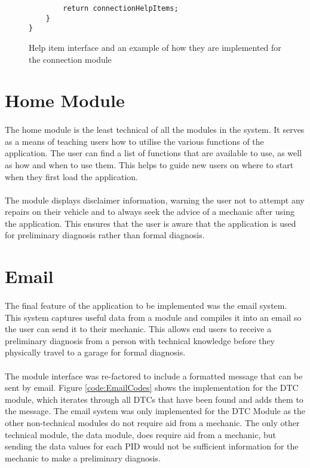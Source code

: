 {\begin{figure}[h]
\begin{lstlisting}
    	return connectionHelpItems;
	}	
}
			\end{lstlisting}
			\caption{Help item interface and an example of how they are implemented for the connection module}
			\label{code:HelpItem}
		\end{figure}
	\newpage
\section{Home Module}
		\paragraph{}{
		The home module is the least technical of all the modules in the system. It serves as a means of teaching users how to utilise the various functions of the application. The user can find a list of functions that are available to use, as well as how and when to use them. This helps to guide new users on where to start when they first load the application.
		}
				
		\paragraph{}{
		The module displays disclaimer information, warning the user not to attempt any repairs on their vehicle and to always seek the advice of a mechanic after using the application. This ensures that the user is aware that the application is used for preliminary diagnosis rather than formal diagnosis.
		}
		

\section{Email}
		\paragraph{}{
		The final feature of the application to be implemented was the email system. This system captures useful data from a module and compiles it into an email so the user can send it to their mechanic. This allows end users to receive a preliminary diagnosis from a person with technical knowledge before they physically travel to a garage for formal diagnosis.		
		}
		\paragraph{}{
		The module interface was re-factored to include a formatted message that can be sent by email. Figure \ref{code:EmailCodes} shows the implementation for the DTC module, which iterates through all DTCs that have been found and adds them to the message. The email system was only implemented for the DTC Module as the other non-technical modules do not require aid from a mechanic. The only other technical module, the data module, does require aid from a mechanic, but sending the data values for each PID would not be sufficient information for the mechanic to make a preliminary diagnosis.
		}

}
